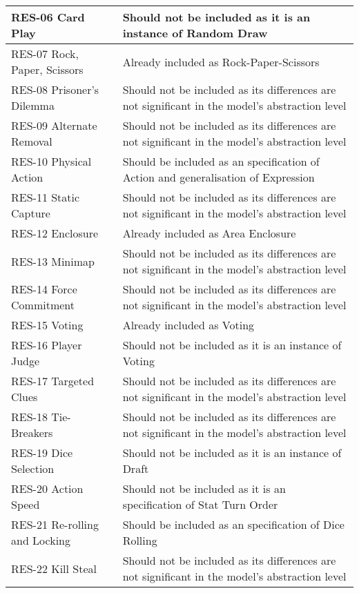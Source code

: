 \begin{longtable}{|m{7cm}|m{7cm}|}
        \hline
        RES-06 Card Play & Should not be included as it is an instance of Random Draw \\
        \hline
        RES-07 Rock, Paper, Scissors & Already included as Rock-Paper-Scissors \\
        \hline
        RES-08 Prisoner's Dilemma & Should not be included as its differences are not significant in the model's abstraction level \\
        \hline
        RES-09 Alternate Removal & Should not be included as its differences are not significant in the model's abstraction level \\
        \hline
        RES-10 Physical Action & Should be included as an specification of Action and generalisation of Expression \\
        \hline
        RES-11 Static Capture & Should not be included as its differences are not significant in the model's abstraction level \\
        \hline
        RES-12 Enclosure & Already included as Area Enclosure \\
        \hline
        RES-13 Minimap & Should not be included as its differences are not significant in the model's abstraction level \\
        \hline
        RES-14 Force Commitment & Should not be included as its differences are not significant in the model's abstraction level \\
        \hline
        RES-15 Voting & Already included as Voting \\
        \hline
        RES-16 Player Judge & Should not be included as it is an instance of Voting \\
        \hline
        RES-17 Targeted Clues & Should not be included as its differences are not significant in the model's abstraction level \\
        \hline
        RES-18 Tie-Breakers & Should not be included as its differences are not significant in the model's abstraction level \\
        \hline
        RES-19 Dice Selection & Should not be included as it is an instance of Draft \\
        \hline
        RES-20 Action Speed & Should not be included as it is an specification of Stat Turn Order \\
        \hline
        RES-21 Re-rolling and Locking & Should be included as an specification of Dice Rolling \\
        \hline
        RES-22 Kill Steal & Should not be included as its differences are not significant in the model's abstraction level \\

\end{longtable}
